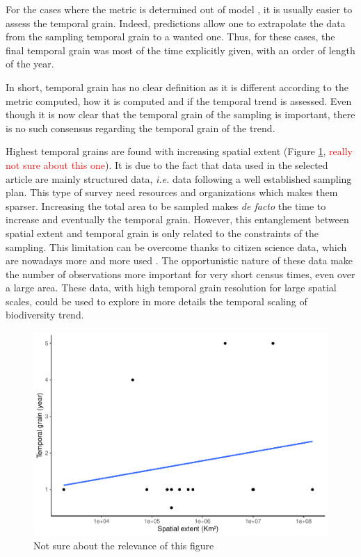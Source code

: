\documentclass[
  12pt,
  oneside]{report}
\begin{document}
For the cases where the metric is determined out of model \autocite[e.g.][]{harrison_assessing_2014}, it is usually easier to assess the temporal grain. Indeed, predictions allow one to extrapolate the data from the sampling temporal grain to a wanted one. Thus, for these cases, the final temporal grain was most of the time explicitly given, with an order of length of the year.

In short, temporal grain has no clear definition as it is different according to the metric computed, how it is computed and if the temporal trend is assessed. Even though it is now clear that the temporal grain of the sampling is important, there is no such consensus regarding the temporal grain of the trend.

Highest temporal grains are found with increasing spatial extent (Figure \ref{fig:spacetimegrain}, \textcolor{red}{really not sure about this one}). It is due to the fact that data used in the selected article are mainly structured data, \emph{i.e.} data following a well established sampling plan. This type of survey need resources and organizations which makes them sparser. Increasing the total area to be sampled makes \emph{de facto} the time to increase and eventually the temporal grain. However, this entanglement between spatial extent and temporal grain is only related to the constraints of the sampling. This limitation can be overcome thanks to citizen science data, which are nowadays more and more used \autocites[\emph{e.g.}][]{bowler_winners_2021,isaac_data_2020,isaac_statistics_2014}. The opportunistic nature of these data make the number of observations more important for very short census times, even over a large area. These data, with high temporal grain resolution for large spatial scales, could be used to explore in more details the temporal scaling of biodiversity trend.

\begin{figure}
\centering
\includegraphics{literature_review_files/figure-latex/spacetimegrain-1.pdf}
\caption{\label{fig:spacetimegrain}Not sure about the relevance of this figure}
\end{figure}
\end{document}
